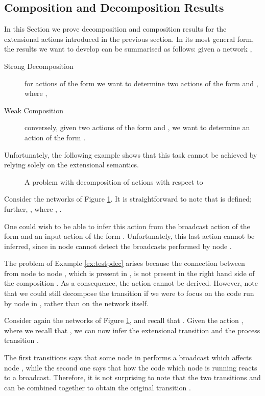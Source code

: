 \documentclass{LMCS}
\begin{document}
\subsection{Composition and Decomposition Results}
\label{sec:comp.decomp}
In this Section we prove decomposition and composition results for 
the extensional actions introduced in the previous section. 
In its most general form, the results we want to develop can be 
summarised as follows: given a network , 
\begin{description}
\item[Strong Decomposition] for actions of the form  
we want to determine two actions of the form  and 
, where ,
\item[Weak Composition] conversely, given two actions of the form 
 and , 
we want to determine an action of the form .
\end{description}\smallskip

\noindent Unfortunately, the following example shows that this task cannot 
be achieved by relying solely on the extensional semantics. 
\begin{figure}


                                   




 \caption{A problem with decomposition of actions with respect to }
\label{fig:testpdec}
\end{figure}

\begin{exa}
\label{ex:testpdec}
Consider the networks  of Figure \ref{fig:testpdec}. 
It is straightforward to note that  is 
defined; further, , 
where , . 

One could wish to be able to infer this action from the broadcast action 
of the form  and an input action 
of the form . Unfortunately, this last action 
cannot be inferred, since in  node  cannot detect the broadcasts 
performed by node .
\end{exa}

The problem of Example \ref{ex:testpdec} arises because the connection between 
from node  to node , which is present in , is not 
present in the right hand side of the composition . 
As a consequence, the action  cannot be derived. 
However, note that we could still decompose the transition  if we were to focus on the code run by node  in , 
rather than on the network  itself.

\begin{exa}
\label{ex:testpdec2}
Consider again the networks  of Figure \ref{fig:testpdec}, and 
recall that . Given the action 
, where 
we recall that , we can 
now infer the 
extensional transition  
and the process transition .

The first transitions says that some node in  performs 
a broadcast which affects node , while the second one says that 
how the code which node  is running reacts to a broadcast. 
Therefore, it is not surprising to note that the two 
transitions  and 
 can be combined together to obtain 
the original transition .
\end{exa}
\end{document}
